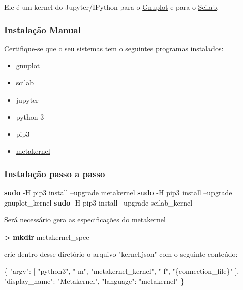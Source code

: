 \documentclass[11pt]{article}
\providecommand{\tightlist}{%
      \setlength{\itemsep}{0pt}\setlength{\parskip}{0pt}}
\newenvironment{Shaded}{}{}
\newcommand{\KeywordTok}[1]{\textcolor[rgb]{0.00,0.44,0.13}{\textbf{{#1}}}}
\newcommand{\DataTypeTok}[1]{\textcolor[rgb]{0.56,0.13,0.00}{{#1}}}
\newcommand{\StringTok}[1]{\textcolor[rgb]{0.25,0.44,0.63}{{#1}}}
\newcommand{\OtherTok}[1]{\textcolor[rgb]{0.00,0.44,0.13}{{#1}}}
\newcommand{\FunctionTok}[1]{\textcolor[rgb]{0.02,0.16,0.49}{{#1}}}
\newcommand{\NormalTok}[1]{{#1}}
\begin{document}
Ele é um kernel do Jupyter/IPython para o
\href{https://github.com/has2k1/gnuplot_kernel}{Gnuplot} e para o
\href{https://github.com/Calysto/scilab_kernel}{Scilab}.

\subsubsection{Instalação Manual}\label{instalauxe7uxe3o-manual}

Certifique-se que o seu sistemas tem o seguintes programas instalados:

\begin{itemize}
\tightlist
\item
  gnuplot
\item
  scilab
\item
  jupyter
\item
  python 3
\item
  pip3
\item
  \href{https://github.com/Calysto/metakernel}{metakernel}
\end{itemize}

\subsubsection{Instalação passo a
passo}\label{instalauxe7uxe3o-passo-a-passo}

\begin{Shaded}
\begin{Highlighting}[]
\KeywordTok{sudo} \NormalTok{-H pip3 install --upgrade metakernel}
\KeywordTok{sudo} \NormalTok{-H pip3 install --upgrade gnuplot_kernel}
\KeywordTok{sudo} \NormalTok{-H pip3 install --upgrade scilab_kernel}
\end{Highlighting}
\end{Shaded}

Será necessário gera as especificações do metakernel

\begin{Shaded}
\begin{Highlighting}[]
\KeywordTok{>} \KeywordTok{mkdir} \NormalTok{metakernel_spec}
\end{Highlighting}
\end{Shaded}

crie dentro desse diretório o arquivo "kernel.json" com o seguinte
conteúdo:

\begin{Shaded}
\begin{Highlighting}[]
\FunctionTok{\{}
  \DataTypeTok{"argv"}\FunctionTok{:} \OtherTok{[}
    \StringTok{"python3"}\OtherTok{,}
    \StringTok{"-m"}\OtherTok{,}
    \StringTok{"metakernel_kernel"}\OtherTok{,}
    \StringTok{"-f"}\OtherTok{,}
    \StringTok{"\{connection_file\}"}
  \OtherTok{]}\FunctionTok{,}
  \DataTypeTok{"display_name"}\FunctionTok{:} \StringTok{"Metakernel"}\FunctionTok{,}
  \DataTypeTok{"language"}\FunctionTok{:} \StringTok{"metakernel"}
\FunctionTok{\}}
\end{Highlighting}
\end{Shaded}
\end{document}
